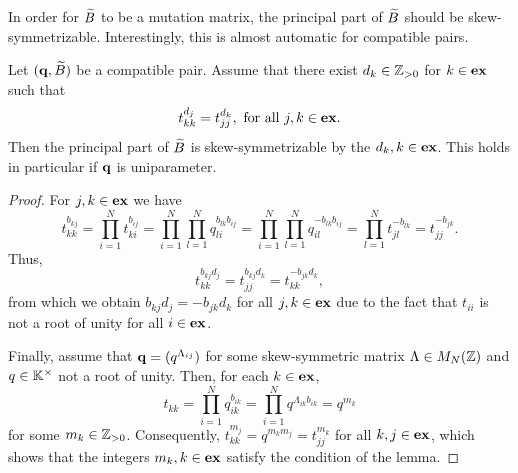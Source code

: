 In order for $\widetilde{B}$ to be a mutation matrix, the principal part of $\widetilde{B}$ should be
skew-symmetrizable. Interestingly, this is almost automatic for compatible pairs.
\begin{lemma}\label{lem:principal_part_skew_symmetrizable}
	Let $(\mathbf{q}, \widetilde{B})$ be a compatible pair. Assume that there exist $d_k \in \mathbb{Z}_{>0}$ for $k \in \mathbf{ex}$ such that
	\begin{equation*}
		t_{kk}^{d_j} = t_{jj}^{d_k}, \text{ for all } j,k \in \mathbf{ex}.
	\end{equation*}
	Then the principal part of $\widetilde{B}$ is skew-symmetrizable by the $d_k, k\in \mathbf{ex}$. This
	holds in particular if $\mathbf{q}$ is uniparameter.
\end{lemma}
\begin{proof}

	For $j,k \in \mathbf{ex}$ we have
	\begin{equation*}
		t_{kk}^{b_{kj}} = \prod_{i=1}^N t_{ki}^{b_{ij}} = \prod_{i=1}^N\prod_{l=1}^N q_{li}^{b_{lk}b_{ij}} =
		\prod_{i=1}^N\prod_{l=1}^N q_{il}^{-b_{lk}b_{ij}} = \prod_{l=1}^N t_{jl}^{-b_{lk}} = t_{jj}^{-b_{jk}}.
	\end{equation*}
	Thus,
	\begin{equation*}
		t_{kk}^{b_{kj} d_j} = t_{jj}^{ b_{kj}d_k} = t_{kk}^{- b_{jk} d_k},
	\end{equation*}
	from which we obtain $b_{kj} d_j = -b_{jk} d_k$ for all $j, k \in \mathbf{ex}$ due to the fact that $t_{ii}$ is not a root of unity for all $i \in \mathbf{ex}$.

	Finally, assume that $\mathbf{q} = (q^{\Lambda_{ij}})$ for some skew-symmetric matrix
	$\Lambda \in M_N(\mathbb{Z})$ and $q \in \mathbb{K}^\times$ not a root of unity. Then, for each $k
		\in \mathbf{ex}$,
	\begin{equation*}
		t_{kk} = \prod_{i=1}^N q_{ik}^{b_{ik}} = \prod_{i=1}^N q^{\Lambda_{ik}b_{ik}} = q^{m_k}
	\end{equation*}
	for some $m_k \in \mathbb{Z}_{> 0}$. Consequently, $t_{kk}^{m_j} = q^{m_km_j} = t_{jj}^{m_k}$ for all $k,j \in \mathbf{ex}$, which shows that the integers $m_k, k\in \mathbf{ex}$ satisfy the condition of the lemma.
\end{proof}

